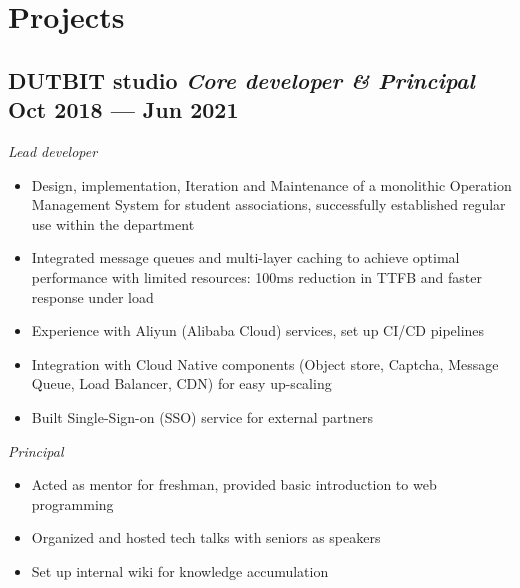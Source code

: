 \documentclass[a4,12pt]{article}
\newcommand{\subtext}[1]{
#1\par\vspace{-0.3cm}}
\newenvironment{zitemize}{
\begin{itemize}\itemsep0pt \parskip0pt \parsep1pt}
{\end{itemize}\vspace{-0.5cm}}
\begin{document}


\section{\textbf{Projects}} %



\subsection*{DUTBIT studio {\normalsize\normalfont \textit{Core developer \& Principal}} \hfill  Oct 2018 --- Jun 2021} 
\subtext{\textit{Lead developer}}
    \begin{zitemize}
        \item Design, implementation, Iteration and Maintenance of a monolithic Operation Management System for student associations, successfully established regular use within the department
        \item Integrated message queues and multi-layer caching to achieve optimal performance with limited resources: 100ms reduction in TTFB and faster response under load
        \item Experience with Aliyun (Alibaba Cloud) services, set up CI/CD pipelines
        \item Integration with Cloud Native components (Object store, Captcha, Message Queue, Load Balancer, CDN) for easy up-scaling
        \item Built Single-Sign-on (SSO) service for external partners 
    \end{zitemize}
\vspace{0.3cm}
\subtext{\textit{Principal}}
\begin{zitemize}
    \item Acted as mentor for freshman, provided basic introduction to web programming
    \item Organized and hosted tech talks with seniors as speakers
    \item Set up internal wiki for knowledge accumulation
\end{zitemize}
\end{document}
